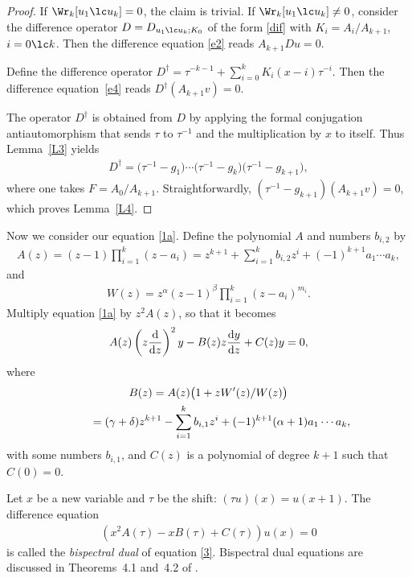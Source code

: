 \begin{proof} If $\Wr_k[u_1\lc u_k]=0$, the claim is trivial. If $\Wr_k[u_1\lc u_k]\ne 0$, consider the difference operator $D=D_{u_1\lc u_k; K_0}$ of the form \eqref{dif} with $K_i=A_i/A_{k+1}$, $i=0\lc k$. Then the difference equation \eqref{e2} reads $A_{k+1} Du=0$.

Define the difference operator $D^\dag=\tau^{-k-1}+\sum\limits_{i=0}^kK_i(x-i) \tau^{-i}$. Then the difference equa\-tion~\eqref{e4} reads $D^\dag(A_{k+1}v)=0$.

The operator $D^\dag$ is obtained from $D$ by applying the formal conjugation antiautomorphism that sends $\tau$ to $\tau^{-1}$ and the multiplication by $x$ to itself. Thus Lemma~\ref{L3} yields
\begin{gather*}
D^\dag= \big(\tau^{-1}-g_1\big) \cdots \big(\tau^{-1}-g_k\big) \big(\tau^{-1}-g_{k+1}\big),
\end{gather*}
where one takes $F=A_0/A_{k+1}$. Straightforwardly, $(\tau^{-1}-g_{k+1}) (A_{k+1}v)=0$, which proves Lemma~\ref{L4}.
 \end{proof}

Now we consider our equation \eqref{1a}. Define the polynomial $A$ and numbers $b_{i,2}$ by
\begin{gather}\label{A}
A(z)=(z-1)\prod_{i=1}^k(z-a_i)= z^{k+1}+\sum_{i=1}^k b_{i,2}z^i+(-1)^{k+1}a_1\cdots a_k,
\end{gather}
and
\begin{gather*}
W(z)=z^\alpha(z-1)^\beta\prod_{i=1}^k(z-a_i)^{m_i}.
\end{gather*}
Multiply equation \eqref{1a} by $z^2A(z)$, so that it becomes
\begin{gather}
A(z) \left(z\frac{{\rm d}}{{\rm d}z}\right)^{ 2}y-B(z) z\frac{{\rm d}y}{{\rm d}z}+C(z)y=0,\label{3}
\end{gather}
where
\begin{gather}%
B(z) = A(z)\bigl(1+zW'(z)/W(z)\bigr)\nonumber\\
\hphantom{B(z)}{} = (\gamma+\delta)z^{k+1}-\sum_{i=1}^k b_{i,1}z^i+(-1)^{k+1}(\alpha+1) a_1\cdots a_k,\label{B2}
\end{gather}
with some numbers $b_{i,1}$, and $C(z)$ is a polynomial of degree $k+1$ such that $C(0)=0$.

Let $x$ be a new variable and $\tau$ be the shift: $(\tau u)(x)=u(x+1)$. The difference equation
\begin{gather}
\left(x^2A(\tau)-xB(\tau)+C(\tau)\right) u(x)=0\label{4}
\end{gather}
is called the {\it bispectral dual} of equation \eqref{3}. Bispectral dual equations are discussed in Theorems~4.1 and~4.2 of \cite{MTV}.

